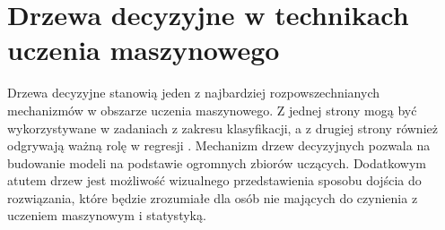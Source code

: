 \section{Drzewa decyzyjne w technikach uczenia maszynowego}

Drzewa decyzyjne stanowią jeden z najbardziej rozpowszechnianych mechanizmów w obszarze uczenia maszynowego. Z jednej strony mogą być wykorzystywane w zadaniach z zakresu klasyfikacji, a z drugiej strony również odgrywają ważną rolę w regresji \cite{book_1}. Mechanizm drzew decyzyjnych pozwala na budowanie modeli na podstawie ogromnych zbiorów uczących. Dodatkowym atutem drzew jest możliwość wizualnego przedstawienia sposobu dojścia do rozwiązania, które będzie zrozumiałe dla osób nie mających do czynienia z uczeniem maszynowym i statystyką.


